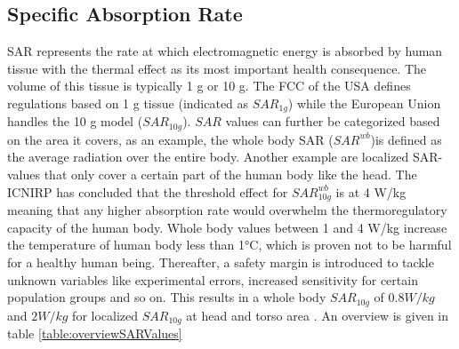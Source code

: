 \subsection{Specific Absorption Rate}
\gls{SAR} represents the rate at which electromagnetic energy is absorbed by human tissue with the thermal effect as its most important health consequence.
The volume of this tissue is typically 1 g or 10 g. The \gls{FCC} of the \gls{USA} defines regulations based on 1 g tissue (indicated as $SAR_{1g}$) 
while the European Union handles the 
10 g model ($SAR_{10g}$). $SAR$ values can further be categorized based on the area it covers, as an example, 
the whole body \gls{SAR} ($SAR^{wb}$)is defined as the average radiation over the entire body.
Another  example are localized \gls{SAR}-values that only cover a certain part of the human body like the head.
The \gls{ICNIRP} has concluded that the threshold effect for $SAR^{wb}_{10g}$ is at 4 W/kg meaning that any higher absorption rate would overwhelm the \gls{thermoregulatory capacity} of the human body.
Whole body values between 1 and 4 W/kg increase the temperature of human body less than 1°C, which is proven not to be harmful for a healthy human being\cite{J24}.
Thereafter, a safety margin is introduced to tackle unknown variables like experimental errors, increased sensitivity for certain population groups and so on. 
This results in a whole body $SAR_{10g}$ of $0.8 W/kg$ and $2 W/kg$ for localized $SAR_{10g}$ at head and torso area \cite{J23, S13_normenBelgie}.
An overview is given in table \ref{table:overviewSARValues}


